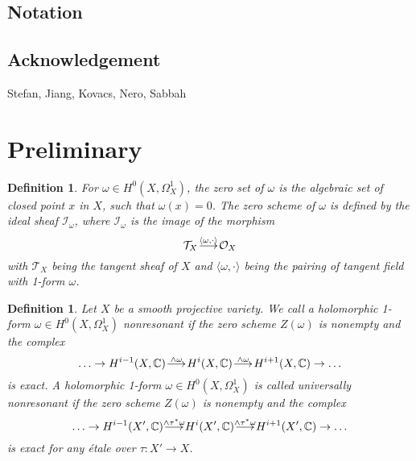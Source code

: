 \documentclass[a4paper,12pt,reqno]{amsart}
\makeatletter
\theoremstyle{plain}
\newtheorem{definition}[theorem]{Definition}
\theoremstyle{remark}
\newcommand{\C}{\mathbb C}
\renewcommand{\longrightarrow}{\xymatrix@1@=15pt{\ar[r]&}}
\makeatother
\begin{document}
\subsection*{Notation}

































\subsection*{Acknowledgement} 

Stefan, Jiang, Kovacs, Nero, Sabbah

\section{Preliminary}



\begin{definition}
For $\omega\in H^0(X, \Omega_X^1)$, the zero set of $\omega$ is the algebraic set of closed point $x$ in $X$, such that $\omega(x)=0$. The zero scheme of $\omega$ is defined by the ideal sheaf $\mathcal{I}_{\omega}$, where  $\mathcal{I}_{\omega}$ is the image of the morphism $$\mathcal{T}_X\overset{\langle\omega, \cdot\rangle}{\longrightarrow} \mathcal{O}_X$$ with $\mathcal{T}_X$ being the tangent sheaf of $X$ and $\langle\omega, \cdot\rangle$ being the pairing of tangent field with 1-form $\omega$.
\end{definition}


\begin{definition}
Let $X$ be a smooth projective variety. We call a holomorphic 1-form $\omega\in H^0(X, \Omega_X^1)$ nonresonant if the zero scheme $Z(\omega)$ is nonempty and the complex $$\ldots\to H^{i-1}(X,\C)\overset{\wedge\omega}{\longrightarrow}H^{i}(X,\C)\overset{\wedge\omega}{\longrightarrow}H^{i+1}(X,\C)\to\ldots$$ is exact. A holomorphic 1-form $\omega\in H^0(X, \Omega_X^1)$ is called universally nonresonant if the zero scheme $Z(\omega)$ is nonempty and the complex $$\ldots\to H^{i-1}(X',\C)\overset{\wedge\tau^*\omega}{\longrightarrow}H^{i}(X',\C)\overset{\wedge\tau^*\omega}{\longrightarrow}H^{i+1}(X',\C)\to\ldots$$ is exact for any \'etale over $\tau: X'\to X$.
\end{definition}
\end{document}
